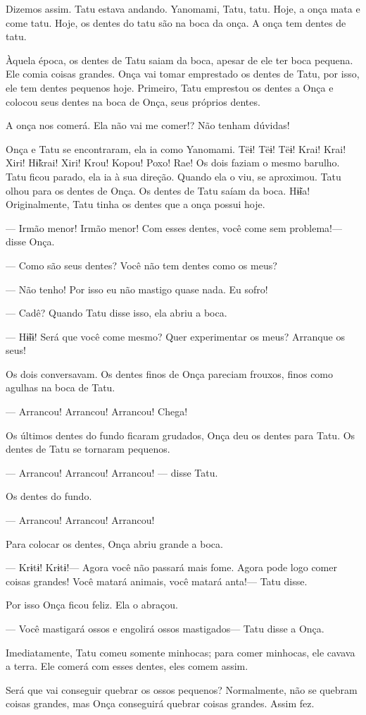  

 Dizemos assim. Tatu estava andando. Yanomami, Tatu, tatu.
Hoje, a onça mata e come tatu. Hoje, os dentes do tatu são na boca da
onça. A onça tem dentes de tatu. 

Àquela época, os dentes de Tatu saiam da boca, apesar de ele ter boca
pequena. Ele comia coisas grandes. Onça vai tomar emprestado os dentes
de Tatu, por isso, ele tem dentes pequenos hoje. Primeiro, Tatu
emprestou os dentes a Onça e colocou seus dentes na boca de Onça, seus
próprios dentes. 

A onça nos comerá. Ela não vai me comer!? Não tenham dúvidas! 

Onça e Tatu se encontraram, ela ia como Yanomami. Tëɨ! Tëɨ! Tëɨ! Krai!
Krai! Xiri! Hɨ̃krai! Xiri! Krou! Kopou! Poxo! Rae! Os dois faziam o mesmo
barulho. Tatu ficou parado, ela ia à sua direção. Quando ela o viu, se
aproximou. Tatu olhou para os dentes de Onça. Os dentes de Tatu saíam da
boca. Hɨ̃ɨa! Originalmente, Tatu tinha os dentes que a onça possui hoje. 

--- Irmão menor! Irmão menor! Com esses dentes, você come sem
problema!--- disse Onça. 

--- Como são seus dentes? Você não tem dentes como os meus?

--- Não tenho! Por isso eu não mastigo quase nada. Eu sofro! 

--- Cadê? Quando Tatu disse isso, ela abriu a boca. 

--- Hɨ̃ɨɨ! Será que você come mesmo? Quer experimentar os meus? Arranque
os seus! 

Os dois conversavam. Os dentes finos de Onça pareciam frouxos, finos
como agulhas na boca de Tatu.

--- Arrancou! Arrancou! Arrancou! Chega! 

Os últimos dentes do fundo ficaram grudados, Onça deu os dentes para
Tatu. Os dentes de Tatu se tornaram pequenos.

--- Arrancou! Arrancou! Arrancou! --- disse Tatu.

Os dentes do fundo. 

--- Arrancou! Arrancou! Arrancou! 

Para colocar os dentes, Onça abriu grande a boca. 

--- Krɨtɨ! Krɨtɨ!--- Agora você não passará mais fome. Agora pode logo
comer coisas grandes! Você matará animais, você matará anta!--- Tatu
disse. 

Por isso Onça ficou feliz. Ela o abraçou. 

--- Você mastigará ossos e engolirá ossos mastigados--- Tatu disse a
Onça. 

Imediatamente, Tatu comeu somente minhocas; para comer minhocas, ele
cavava a terra. Ele comerá com esses dentes, eles comem assim. 

Será que vai conseguir quebrar os ossos pequenos? Normalmente, não se
quebram coisas grandes, mas Onça conseguirá quebrar coisas grandes.
Assim fez. 

 

